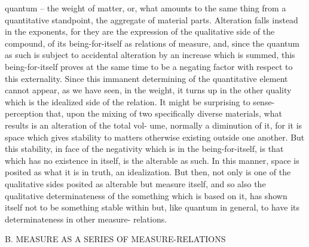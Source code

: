 quantum – the weight of matter, or, what amounts to the same thing from
a quantitative standpoint, the aggregate of material parts. Alteration falls
instead in the exponents, for they are the expression of the qualitative side
of the compound, of its being-for-itself as relations of measure, and, since
the quantum as such is subject to accidental alteration by an increase which
is summed, this being-for-itself proves at the same time to be a negating
factor with respect to this externality. Since this immanent determining of
the quantitative element cannot appear, as we have seen, in the weight, it
turns up in the other quality which is the idealized side of the relation.
It might be surprising to sense-perception that, upon the mixing of two
specifically diverse materials, what results is an alteration of the total vol-
ume, normally a diminution of it, for it is space which gives stability to
matters otherwise existing outside one another. But this stability, in face of
the negativity which is in the being-for-itself, is that which has no existence
in itself, is the alterable as such. In this manner, space is posited as what it
is in truth, an idealization.
But then, not only is one of the qualitative sides posited as alterable but
measure itself, and so also the qualitative determinateness of the something
which is based on it, has shown itself not to be something stable within
but, like quantum in general, to have its determinateness in other measure-
relations.

B. MEASURE AS A SERIES OF MEASURE-RELATIONS

